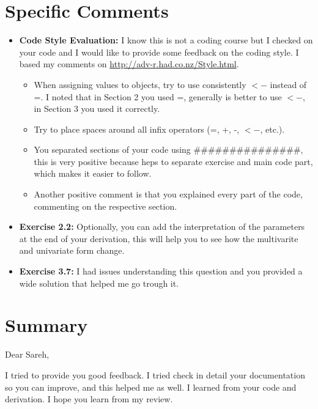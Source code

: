 \documentclass[11 pt]{article}
\begin{document}
\section{Specific Comments}
\begin{itemize}
		\item \textbf{Code Style Evaluation:} I know this is not a coding course but I checked on your code and I would like to provide some feedback on the coding style. I based my comments on \url{http://adv-r.had.co.nz/Style.html}.
		\begin{itemize}
			\item When assigning values to objects, try to use consistently $<-$ instead of =. I noted that in Section 2 you used =, generally is better to use $<-$, in Section 3 you used it correctly.
			\item Try to place spaces around all infix operators (=, +, -, $<-$, etc.). 
			\item You separated sections of your code using $\#\#\#\#\#\#\#\#\#\#\#\#\#\#\#$, this is very positive because heps to separate exercise and main code part, which makes it easier to follow.
			\item Another positive comment is that you explained every part of the code, commenting on the respective section.
		\end{itemize}
		\item \textbf{Exercise 2.2:} Optionally, you can add the interpretation of the parameters at the end of your derivation, this will help you to see how the multivarite and univariate form change.
		\item \textbf{Exercise 3.7:} I had issues understanding this question and you provided a wide solution that helped me go trough it. 

\end{itemize}

\section{Summary}
Dear Sareh, 

I tried to provide you good feedback. I tried check in detail your documentation so you can improve, and this helped me as well. I learned from your code and derivation. I hope you learn from my review.
\end{document}
